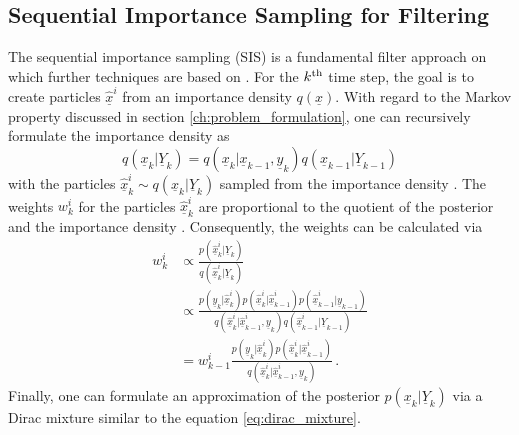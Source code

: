 \documentclass[a4paper]{IEEEtran}
\begin{document}
\subsection{Sequential Importance Sampling for Filtering}
\label{ch:importance_sampling}
The sequential importance sampling (SIS) is a fundamental filter approach on which further techniques are based on \cite{arulampalam2002}. For the $k\textsuperscript{th}$ time step, the goal is to create particles $\underline{\hat{x}}^{i}$ from an importance density $q(\underline{x})$. With regard to the Markov property discussed in section \ref{ch:problem_formulation}, one can recursively formulate the importance density as
\begin{equation}
        q(\underline{x}_{k} \vert \underline{Y}_{k}) = q(\underline{x}_{k} \vert \underline{x}_{k-1}, \underline{y}_{k}) q(\underline{x}_{k-1} \vert  \underline{Y}_{k-1}) 
        \label{eq:importance_density}
\end{equation}
with the particles $\underline{\hat{x}}_{k}^{i} \sim q(\underline{x}_{k} \vert \underline{Y}_{k})$ sampled from the importance density \cite{arulampalam2002}.
The weights $w_{k}^{i}$ for the particles $\underline{\hat{x}}_{k}^{i}$ are proportional to the quotient of the posterior and the importance density \cite{cappe2007b}. Consequently, the weights can be calculated via
\begin{equation}
    \begin{split}
        w_{k}^{i} &\propto \frac{p(\underline{\hat{x}}_{k}^{i} \vert \underline{Y}_{k})}{q(\underline{\hat{x}}_{k}^{i} \vert \underline{Y}_{k})} \\
        &\propto \frac{p(\underline{y}_{k}\vert \underline{\hat{x}}_{k}^{i}) p(\underline{\hat{x}}_{k}^{i} \vert \underline{\hat{x}}_{k-1}^{i}) p(\underline{\hat{x}}_{k-1}^{i} \vert \underline{y}_{k-1})}{q(\underline{\hat{x}}_{k}^{i} \vert \underline{\hat{x}}_{k-1}^{i}, \underline{y}_{k}) q(\underline{\hat{x}}_{k-1}^{i} \vert \underline{Y}_{k-1})} \\
        &= w_{k-1}^{i} \frac{p(\underline{y}_{k}\vert \underline{\hat{x}}_{k}^{i}) p(\underline{\hat{x}}_{k}^{i} \vert \underline{\hat{x}}_{k-1}^{i})}{q(\underline{\hat{x}}_{k}^{i} \vert \underline{\hat{x}}_{k-1}^{i}, \underline{y}_{k})} \,.
    \end{split}
    \label{eq:weight_update_importance}
\end{equation}
Finally, one can formulate an approximation of the posterior $p(\underline{x}_{k} \vert \underline{Y}_{k})$ via a Dirac mixture similar to the equation \eqref{eq:dirac_mixture}. 
\end{document}

